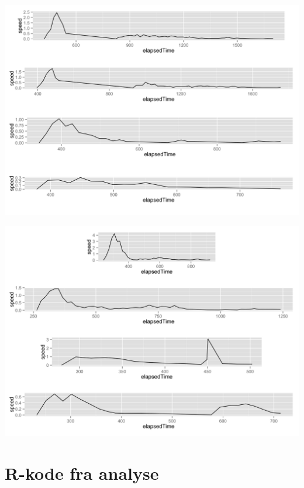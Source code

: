 \begin{appendices}
\begin{minipage}{\textwidth}
\begin{minipage}{0.5\linewidth}
	\end{minipage}
	\begin{minipage}{0.5\linewidth}
		\includegraphics[width=\linewidth]{images/plots/plot_speed_time_individual_239}
	\end{minipage}
	\begin{minipage}{0.5\linewidth}
		\includegraphics[width=\linewidth]{images/plots/plot_speed_time_individual_263}
	\end{minipage}
	\label{fig:kvaliativ_persons_3}
\end{minipage}


\chapter{R-kode fra analyse}
\label{sec:r-code}


\end{appendices}